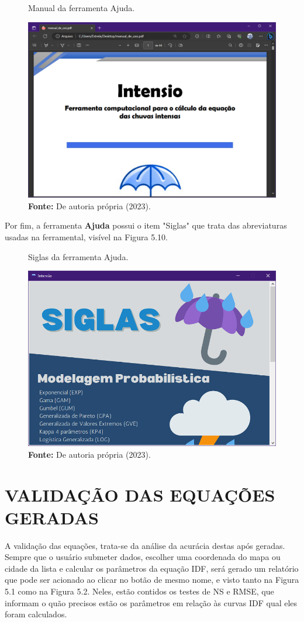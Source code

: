 \begin{figure}[!ht]
	\centering
	\caption{Manual da ferramenta Ajuda.}
	\includegraphics[width=.7625\linewidth]{figuras/manual.png}
	\caption*{\textbf{Fonte:} De autoria própria (2023).}
	\label{fig:figuras/manual.png}
\end{figure}

Por fim, a ferramenta \textbf{Ajuda} possui o item "Siglas" que trata das abreviaturas usadas na ferramental, visível na Figura 5.10.

\begin{figure}[!ht]
	\centering
	\caption{Siglas da ferramenta Ajuda.}
	\includegraphics[width=.7625\linewidth]{figuras/siglas.png}
	\caption*{\textbf{Fonte:} De autoria própria (2023).}
	\label{fig:figuras/siglas.png}
\end{figure}

\newpage

\section{VALIDAÇÃO DAS EQUAÇÕES GERADAS}

A validação das equações, trata-se da análise da acurácia destas após geradas. Sempre que o usuário submeter dados, escolher uma coordenada do mapa ou cidade da lista e calcular os parâmetros da equação IDF, será gerado um relatório que pode ser acionado ao clicar no botão de mesmo nome, e visto tanto na Figura 5.1 como na Figura 5.2. Neles, estão contidos os testes de NS e RMSE, que informam o quão precisos estão os parâmetros em relação às curvas IDF qual eles foram calculados.

